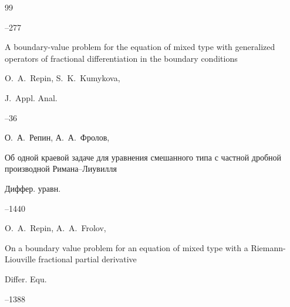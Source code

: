 \begin{thebibliography}{99}



--277








\paper A boundary-value problem for the equation of mixed type with generalized operators of fractional differentiation in the boundary conditions 	

\by O.~A.~Repin, S.~K.~Kumykova,  	


\jour J.~Appl. Anal. 



--36 







\by О.~А.~Репин, А.~А.~Фролов,

\paper Об одной краевой задаче для уравнения смешанного типа с частной дробной производной Римана--Лиувилля 

\jour Диффер. уравн.




--1440

\transl 

\by O.~A.~Repin, A.~A.~Frolov, 

\paper On a boundary value problem for an equation of mixed type with a Riemann-Liouville fractional partial derivative

\jour Differ. Equ. 



--1388 







\end{thebibliography}
